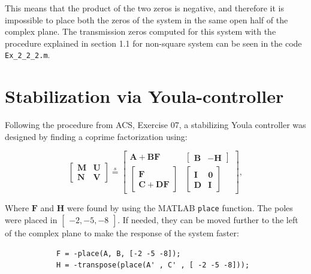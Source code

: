 \documentclass{scrreprt}
\begin{document}
This means that the product of the two zeros is negative, and therefore it is impossible to place both the zeros of the system in the same open half of the complex plane. The transmission zeros computed for this system with the procedure explained in section 1.1 for non-square system can be seen in the code \texttt{Ex\_2\_2\_2.m}.

\section{Stabilization via Youla-controller}
Following the procedure from ACS, Exercise 07, a stabilizing Youla controller was designed by finding a coprime factorization using:

\begin{equation}
    \begin{bmatrix}
        \mathbf{M} & \mathbf{U} \\
        \mathbf{N} & \mathbf{V}
    \end{bmatrix}
    \stackrel{s}{=}
    \left[
    \begin{array}{c|c}
        \mathbf{A} + \mathbf{B}\mathbf{F} & \begin{bmatrix} \mathbf{B} & -\mathbf{H} \end{bmatrix} \\
        \hline
        \begin{bmatrix} \mathbf{F} \\ \mathbf{C} + \mathbf{D}\mathbf{F} \end{bmatrix} & \begin{bmatrix} \mathbf{I} & \mathbf{0} \\ \mathbf{D} & \mathbf{I} \end{bmatrix}
    \end{array}
    \right],
\end{equation}

Where $\boldsymbol{F}$ and $\boldsymbol{H}$ were found by using the MATLAB \texttt{place} function. The poles were placed in $\begin{bmatrix}-2,-5,-8\end{bmatrix}$. If needed, they can be moved further to the left of the complex plane to make the response of the system faster:

\begin{center}
    \centering
    \begin{verbatim}
            F = -place(A, B, [-2 -5 -8]);
            H = -transpose(place(A' , C' , [ -2 -5 -8]));
    \end{verbatim}
\end{center}
\end{document}
